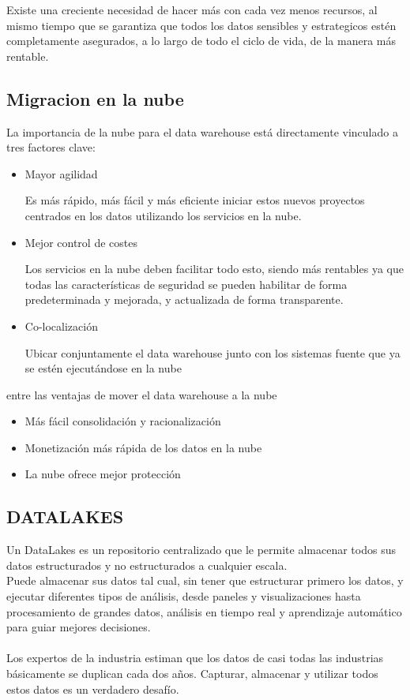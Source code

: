 \documentclass[%
 reprint,
 amsmath,amssymb,
 aps,
]{revtex4-1}
\begin{document}
Existe una creciente necesidad de hacer más con cada vez menos recursos, al mismo tiempo que se garantiza que todos los datos sensibles y estrategicos estén completamente asegurados, a lo largo de todo el ciclo de vida, de la manera más rentable.\cite{robles1}
	

\subsection{Migracion en la nube}

La importancia de la nube para el data warehouse está directamente vinculado a tres factores clave:

\begin{itemize}
	\item Mayor agilidad

Es más rápido, más fácil y más eficiente iniciar estos nuevos proyectos centrados en los datos utilizando los servicios en la nube.

	\item Mejor control de costes

Los servicios en la nube deben facilitar todo esto, siendo más rentables ya que todas las características de seguridad se pueden habilitar de forma predeterminada y mejorada, y actualizada de forma transparente.

	\item Co-localización

Ubicar conjuntamente el data warehouse junto con los sistemas fuente que ya se estén ejecutándose en la nube
\end{itemize}

entre las ventajas de mover el data warehouse a la nube

\begin{itemize}
	\item Más fácil consolidación y racionalización
	\item Monetización más rápida de los datos en la nube
	\item La nube ofrece mejor protección
\end{itemize}


\subsection{DATALAKES}	

Un DataLakes es un repositorio centralizado que le permite almacenar todos sus datos estructurados y no estructurados a cualquier escala. 
\\ Puede almacenar sus datos tal cual, sin tener que estructurar primero los datos, y ejecutar diferentes tipos de análisis, desde paneles y visualizaciones hasta procesamiento de grandes datos, análisis en tiempo real y aprendizaje automático para guiar mejores decisiones.
\\\\
Los expertos de la industria estiman que los datos de casi todas las industrias básicamente se duplican cada dos años. Capturar, almacenar y utilizar todos estos datos es un verdadero desafío. \\
\end{document}
